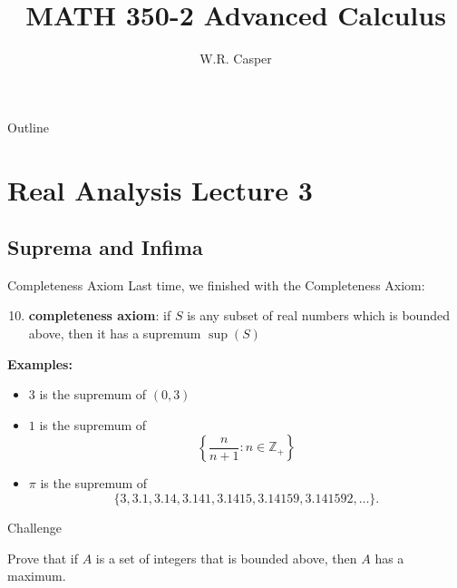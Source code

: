 \documentclass{beamer}
\title{MATH 350-2 Advanced Calculus}
\subtitle
{} %
\author[W.R. Casper] %
{W.R. Casper}
\institute[California State University Fullerton] %
{
  Department of Mathematics\\
  California State University Fullerton}
\begin{document}
\begin{frame}
  \titlepage
\end{frame}

\begin{frame}{Outline}
  \tableofcontents
\end{frame}



\section{Real Analysis Lecture 3}

\subsection{Suprema and Infima}
\begin{frame}{Completeness Axiom}
Last time, we finished with the Completeness Axiom:
\pause
\begin{enumerate}[\text{A}1]
\setcounter{enumi}{9}
\pause
\item \textbf{completeness axiom}: if $S$ is any subset of real numbers which is bounded above, then it has a supremum $\sup(S)$
\end{enumerate}
\pause
\textbf{Examples:}
\begin{itemize}
\pause
\item $3$ is the supremum of $(0,3)$
\pause
\item $1$ is the supremum of
$$\left\lbrace
\frac{n}{n+1}: n\in\mathbb{Z}_+
\right\rbrace$$
\pause
\item $\pi$ is the supremum of
$$\{3,3.1,3.14,3.141,3.1415,3.14159,3.141592,\dots\}.$$
\end{itemize}
\end{frame}

\begin{frame}{Challenge}
\begin{prob}
Prove that if $A$ is a set of integers that is bounded above, then $A$ has a maximum.
\end{prob}
\end{frame}
\end{document}
